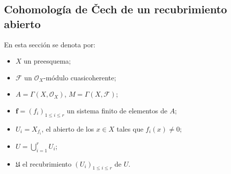 \subsection{Cohomología de \v Cech de un recubrimiento abierto}
\label{subsection:III.1.2}
\label{subsection:III.1.2-fr}

\begin{notation}[1.2.1]
\label{III.1.2.1}
\label{III.1.2.1-fr}
En esta sección se denota por:
\begin{itemize}
  \item $X$ un preesquema;
  \item $\mathcal F$ un $\mathcal O_X$-módulo cuasicoherente;
  \item $A=\Gamma(X,\mathcal O_X)$, $M=\Gamma(X,\mathcal F)$;
  \item $\mathbf f=(f_i)_{1\leq i\leq r}$ un sistema finito de elementos de $A$;
  \item $U_i=X_{f_i}$, el abierto  de los $x\in X$ tales que $f_i(x)\neq0$;
  \item $U=\bigcup_{i=1}^r U_i$;
  \item $\mathfrak U$ el recubrimiento $(U_i)_{1\leq i\leq r}$ de $U$.
\end{itemize}
\end{notation}

